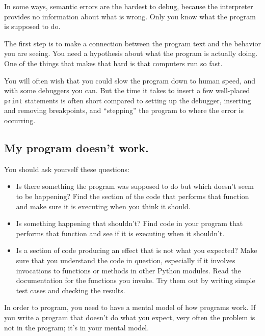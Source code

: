 \documentclass[10pt]{book}
\begin{document}
\begin{CJK}{UTF8}{gbsn}
In some ways, semantic errors are the hardest to debug,
because the interpreter provides no information
about what is wrong.  Only you know what the program is supposed to
do.

The first step is to make a connection between the program
text and the behavior you are seeing.  You need a hypothesis
about what the program is actually doing.  One of the things
that makes that hard is that computers run so fast.

You will often wish that you could slow the program down to human
speed, and with some debuggers you can.  But the time it takes to
insert a few well-placed {\tt print} statements is often short compared to
setting up the debugger, inserting and removing breakpoints, and
``stepping'' the program to where the error is occurring.

\subsection{My program doesn't work.}

You should ask yourself these questions:

\begin{itemize}

\item Is there something the program was supposed to do but
which doesn't seem to be happening?  Find the section of the code
that performs that function and make sure it is executing when
you think it should.

\item Is something happening that shouldn't?  Find code in
your program that performs that function and see if it is
executing when it shouldn't.

\item Is a section of code producing an effect that is not
what you expected?  Make sure that you understand the code in
question, especially if it involves invocations to functions or methods in
other Python modules.  Read the documentation for the functions you invoke.
Try them out by writing simple test cases and checking the results.

\end{itemize}

In order to program, you need to have a mental model of how
programs work.  If you write a program that doesn't do what you expect,
very often the problem is not in the program; it's in your mental
model.


\end{CJK}
\end{document}
